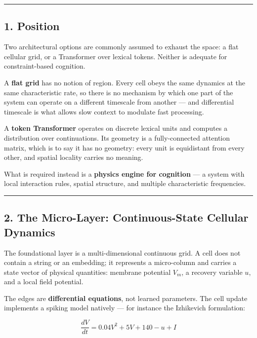 \documentclass[
  11pt,
  a4paper,
]{article}
\begin{document}
\begin{center}\rule{0.5\linewidth}{0.5pt}\end{center}

\subsection{1. Position}\label{position}

Two architectural options are commonly assumed to exhaust the space: a
flat cellular grid, or a Transformer over lexical tokens. Neither is
adequate for constraint-based cognition.

A \textbf{flat grid} has no notion of region. Every cell obeys the same
dynamics at the same characteristic rate, so there is no mechanism by
which one part of the system can operate on a different timescale from
another --- and differential timescale is what allows slow context to
modulate fast processing.

A \textbf{token Transformer} operates on discrete lexical units and
computes a distribution over continuations. Its geometry is a
fully-connected attention matrix, which is to say it has no geometry:
every unit is equidistant from every other, and spatial locality carries
no meaning.

What is required instead is a \textbf{physics engine for cognition} ---
a system with local interaction rules, spatial structure, and multiple
characteristic frequencies.

\begin{center}\rule{0.5\linewidth}{0.5pt}\end{center}

\subsection{2. The Micro-Layer: Continuous-State Cellular
Dynamics}\label{the-micro-layer-continuous-state-cellular-dynamics}

The foundational layer is a multi-dimensional continuous grid. A cell
does not contain a string or an embedding; it represents a micro-column
and carries a state vector of physical quantities: membrane potential
\(V_m\), a recovery variable \(u\), and a local field potential.

The edges are \textbf{differential equations}, not learned parameters.
The cell update implements a spiking model natively --- for instance the
Izhikevich formulation:

\[
\frac{dV}{dt} = 0.04V^2 + 5V + 140 - u + I
\]
\end{document}
